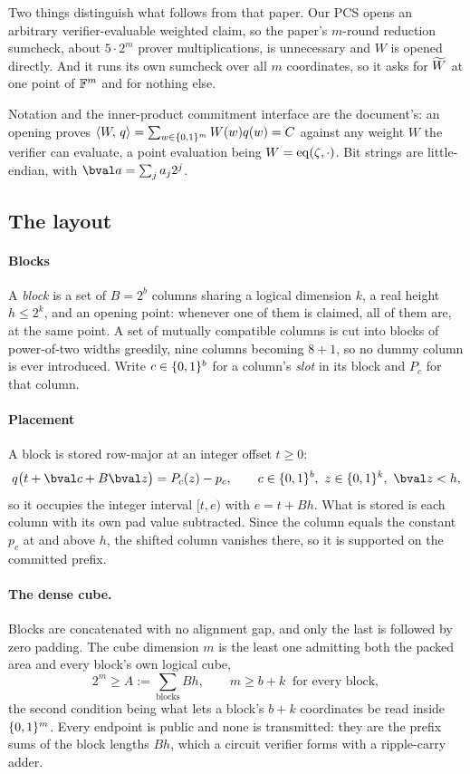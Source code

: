 Two things distinguish what follows from that paper. Our PCS opens an arbitrary verifier-evaluable weighted claim, so the paper's $m$-round reduction sumcheck, about $5\cdot2^m$ prover multiplications, is unnecessary and $W$ is opened directly. And it runs its own sumcheck over all $m$ coordinates, so it asks for $\widetilde{W}$ at one point of $\mathbb{F}^m$ and for nothing else.

Notation and the inner-product commitment interface are the document's: an opening proves $\langle W,\, q \rangle=\sum_{w\in\{0,1\}^{m}}W(w)q(w)=C$ against any weight $W$ the verifier can evaluate, a point evaluation being $W=\operatorname{eq}(\zeta,\cdot)$. Bit strings are little-endian, with $\bval a=\sum_j a_j2^j$.

\subsection{The layout}\label{jag:layout}

\paragraph{Blocks} A \emph{block} is a set of $B=2^b$ columns sharing a logical dimension $k$, a real height $h\le2^k$, and an opening point: whenever one of them is claimed, all of them are, at the same point. A set of mutually compatible columns is cut into blocks of power-of-two widths greedily, nine columns becoming $8+1$, so no dummy column is ever introduced. Write $c\in\{0,1\}^{b}$ for a column's \emph{slot} in its block and $P_c$ for that column.

\paragraph{Placement} A block is stored row-major at an integer offset $t\ge0$:
\begin{equation}
  q\bigl(t+\bval c+B\bval z\bigr)=P_c(z)-p_c,\qquad c\in\cube b,\ z\in\cube k,\ \bval z<h,
  \label{eq:jag-place}
\end{equation}
so it occupies the integer interval $[t,e)$ with $e=t+Bh$. What is stored is each column with its own pad value subtracted. Since the column equals the constant $p_c$ at and above $h$, the shifted column vanishes there, so it is supported on the committed prefix.

\paragraph{The dense cube.} Blocks are concatenated with no alignment gap, and only the last is followed by zero padding. The cube dimension $m$ is the least one admitting both the packed area and every block's own logical cube,
\[
  2^m\ge A:=\sum_{\text{blocks}}Bh,\qquad m\ge b+k\ \text{ for every block},
\]
the second condition being what lets a block's $b+k$ coordinates be read inside $\{0,1\}^{m}$. Every endpoint is public and none is transmitted: they are the prefix sums of the block lengths $Bh$, which a circuit verifier forms with a ripple-carry adder.

